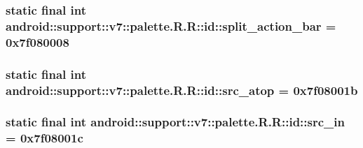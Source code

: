 \hypertarget{classandroid_1_1support_1_1v7_1_1palette_1_1_r_1_1id_ce11b335826d1a2c8c5fd5d7403de403}{
\subsubsection[{split\_\-action\_\-bar}]{\setlength{\rightskip}{0pt plus 5cm}static final int android::support::v7::palette.R.R::id::split\_\-action\_\-bar = 0x7f080008}}
\label{classandroid_1_1support_1_1v7_1_1palette_1_1_r_1_1id_ce11b335826d1a2c8c5fd5d7403de403}


\hypertarget{classandroid_1_1support_1_1v7_1_1palette_1_1_r_1_1id_fd55e4ce8521748548f5bda64e8dfec1}{
\subsubsection[{src\_\-atop}]{\setlength{\rightskip}{0pt plus 5cm}static final int android::support::v7::palette.R.R::id::src\_\-atop = 0x7f08001b}}
\label{classandroid_1_1support_1_1v7_1_1palette_1_1_r_1_1id_fd55e4ce8521748548f5bda64e8dfec1}


\hypertarget{classandroid_1_1support_1_1v7_1_1palette_1_1_r_1_1id_288fe239574887d65909d2edf9b8449e}{
\subsubsection[{src\_\-in}]{\setlength{\rightskip}{0pt plus 5cm}static final int android::support::v7::palette.R.R::id::src\_\-in = 0x7f08001c}}
\label{classandroid_1_1support_1_1v7_1_1palette_1_1_r_1_1id_288fe239574887d65909d2edf9b8449e}



